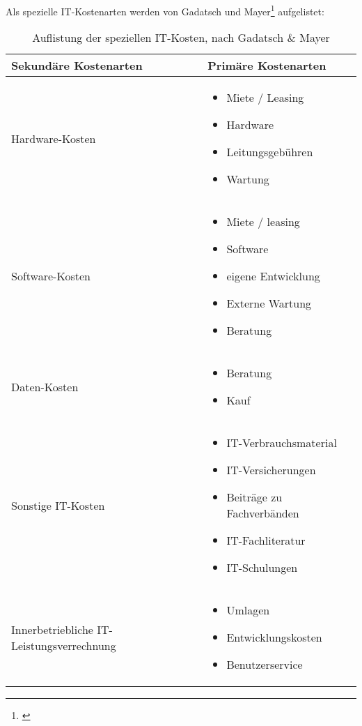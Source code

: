 Als spezielle IT-Kostenarten werden von Gadatsch und Mayer\footnote{\cite{gadatsch_masterkurs_2014}} aufgelistet:
\begin{table}[h!]
	\begin{tabularx}{\textwidth}{|l|X|}
		\hline \textbf{Sekundäre Kostenarten}  &  \textbf{Primäre Kostenarten}\\
		\hline Hardware-Kosten &
		\begin{itemize}
			\item Miete / Leasing
			\item Hardware
			\item Leitungsgebühren
			\item Wartung
		\end{itemize} \\ 
		\hline Software-Kosten  & 
		\begin{itemize}
			\item Miete / leasing
			\item Software
			\item eigene Entwicklung
			\item Externe Wartung
			\item Beratung
		\end{itemize} \\ 
	\hline Daten-Kosten &
	\begin{itemize}
		\item Beratung
		\item Kauf
	\end{itemize}  \\
	\hline Sonstige IT-Kosten &
		\begin{itemize}
			\item IT-Verbrauchsmaterial
			\item IT-Versicherungen
			\item Beiträge zu Fachverbänden
			\item IT-Fachliteratur
			\item IT-Schulungen
		\end{itemize}\\
	\hline Innerbetriebliche IT-Leistungsverrechnung & 
	\begin{itemize}
		\item Umlagen
		\item Entwicklungskosten
		\item Benutzerservice
	\end{itemize}\\
	\hline
\end{tabularx}
\caption{Auflistung der speziellen IT-Kosten, nach Gadatsch \& Mayer}
\label{tab_auflistung_spezielle_IT_Kosten}
\end{table}

